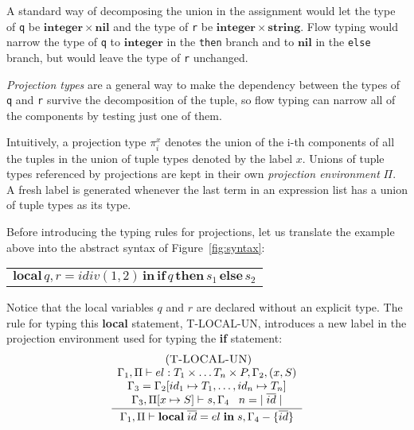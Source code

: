 \documentclass{sigplanconf}
\newcommand{\Nil}{\mathbf{nil}}
\newcommand{\Integer}{\mathbf{integer}}
\newcommand{\String}{\mathbf{string}}
\newcommand{\mylabel}[1]{\; (\textsc{#1})}
\newcommand{\env}{\Gamma}
\newcommand{\penv}{\Pi}
\begin{document}
A standard way of decomposing the union in the assignment
would let the type of {\tt q} be $\Integer \times \Nil$ and
the type of {\tt r} be $\Integer \times \String$. Flow typing
would narrow the type of {\tt q} to $\Integer$ in the {\tt then}
branch and to $\Nil$ in the {\tt else} branch, but would
leave the type of {\tt r} unchanged.

{\em Projection types}
are a general way to make the dependency between the types
of {\tt q} and {\tt r} survive the decomposition of the tuple,
so flow typing can narrow all of the components by testing
just one of them.

Intuitively, a projection type $\pi_{i}^{x}$ denotes the union of
the i-th components of all the tuples in the union of tuple types
denoted by the label $x$. Unions of tuple types referenced by projections are kept in their own {\em projection environment} $\Pi$. A fresh label is generated whenever the last term
in an expression list has a union of tuple types as its type.

Before introducing the typing rules for projections, let us translate the example above into the abstract syntax of Figure~\ref{fig:syntax}:
\begin{center}
	\begin{tabular}{ll}
		\multicolumn{2}{l}{$\mathbf{local} \, q, r = idiv(1, 2) \, \mathbf{in} \, \mathbf{if} \, q \, \mathbf{then} \, s_1 \, \mathbf{else} \, s_2$}
	\end{tabular}
\end{center}

Notice that the local variables $q$ and $r$ are declared without 
an explicit type. The rule for typing this {\bf local} statement,
{\sc T-LOCAL-UN}, introduces a new label in the projection
environment used for typing the {\bf if} statement:
\[
\begin{array}{c}
\mylabel{T-LOCAL-UN}\\
\dfrac{\begin{array}{c}
	\env_{1}, \penv \vdash el:T_1 \times \ldots T_n \times P, \env_{2}, (x,S)\\
	\env_{3} = \env_{2}[id_{1} \mapsto T_1, \ldots, id_{n} \mapsto T_n]\\
	\env_{3}, \penv[x \mapsto S] \vdash s, \env_{4} \;\;\;
	n = |\;\overline{id}\;|  
	\end{array}}
{\env_{1}, \penv \vdash \mathbf{local} \; \overline{id} = el \; \mathbf{in} \; s, \env_{4} - \{\overline{id}\}}
\end{array}
\]
\end{document}
